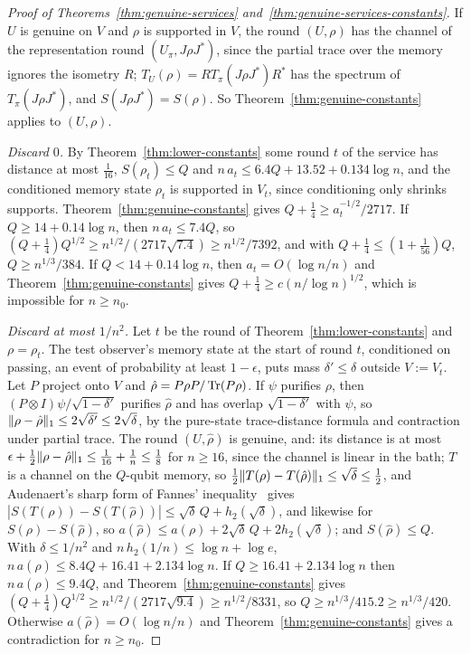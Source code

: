 \begin{proof}[Proof of Theorems~\ref{thm:genuine-services} and~\ref{thm:genuine-services-constants}]
If $U$ is genuine on $V$ and $\rho$ is supported in $V$, the round $(U,\rho)$ has the channel of the representation round $(U_\pi,J\rho J^*)$, since the partial trace over the memory
ignores the isometry $R$; $T_U(\rho)=RT_\pi(J\rho J^*)R^*$ has the spectrum of $T_\pi(J\rho J^*)$, and $S(J\rho J^*)=S(\rho)$. So Theorem~\ref{thm:genuine-constants} applies to $(U,\rho)$.

\emph{Discard $0$.} By Theorem~\ref{thm:lower-constants} some round $t$ of the service has distance at most $\frac1{16}$, $S(\rho_t)\le Q$ and $n\,a_t\le6.4Q+13.52+0.134\log n$, and the
conditioned memory state $\rho_t$ is supported in $V_t$, since conditioning only shrinks supports. Theorem~\ref{thm:genuine-constants} gives $Q+\frac14\ge a_t^{-1/2}/2717$. If
$Q\ge14+0.14\log n$, then $n\,a_t\le7.4Q$, so $(Q+\frac14)Q^{1/2}\ge n^{1/2}/(2717\sqrt{7.4})\ge n^{1/2}/7392$, and with $Q+\frac14\le(1+\frac1{56})Q$, $Q\ge n^{1/3}/384$. If
$Q<14+0.14\log n$, then $a_t=O(\log n/n)$ and Theorem~\ref{thm:genuine-constants} gives $Q+\frac14\ge c(n/\log n)^{1/2}$, which is impossible for $n\ge n_0$.

\emph{Discard at most $1/n^2$.} Let $t$ be the round of Theorem~\ref{thm:lower-constants} and $\rho=\rho_t$. The test observer's memory state at the start of round $t$, conditioned on
passing, an event of probability at least $1-\epsilon$, puts mass $\delta'\le\delta$ outside $V:=V_t$. Let $P$ project onto $V$ and $\hat\rho=P\rho P/\operatorname{Tr}(P\rho)$. If $\psi$ purifies $\rho$, then
$(P\otimes I)\psi/\sqrt{1-\delta'}$ purifies $\hat\rho$ and has overlap $\sqrt{1-\delta'}$ with $\psi$, so $\lVert \rho-\hat\rho\rVert_1\le2\sqrt{\delta'}\le2\sqrt\delta$, by the pure-state trace-distance formula and contraction under partial trace. The round $(U,\hat\rho)$ is genuine, and:
its distance is at most $\epsilon+\frac12\lVert \rho-\hat\rho\rVert_1\le\frac1{16}+\frac1n\le\frac18$ for $n\ge16$, since the channel is linear in the bath; $T$ is a channel on the $Q$-qubit memory,
so $\frac12\lVert T(\rho)-T(\hat\rho)\rVert_1\le\sqrt\delta\le\frac12$, and Audenaert's sharp form of Fannes' inequality~\cite[Theorem~1]{Audenaert2007} gives
$|S(T(\rho))-S(T(\hat\rho))|\le\sqrt\delta\,Q+h_2(\sqrt\delta)$, and likewise for $S(\rho)-S(\hat\rho)$, so $a(\hat\rho)\le a(\rho)+2\sqrt\delta\,Q+2h_2(\sqrt\delta)$; and $S(\hat\rho)\le Q$. With
$\delta\le1/n^2$ and $n\,h_2(1/n)\le\log n+\log e$, $n\,a(\hat\rho)\le8.4Q+16.41+2.134\log n$. If $Q\ge16.41+2.134\log n$ then $n\,a(\hat\rho)\le9.4Q$, and
Theorem~\ref{thm:genuine-constants} gives $(Q+\frac14)Q^{1/2}\ge n^{1/2}/(2717\sqrt{9.4})\ge n^{1/2}/8331$, so $Q\ge n^{1/3}/415.2\ge n^{1/3}/420$. Otherwise $a(\hat\rho)=O(\log n/n)$ and
Theorem~\ref{thm:genuine-constants} gives a contradiction for $n\ge n_0$.
\end{proof}

